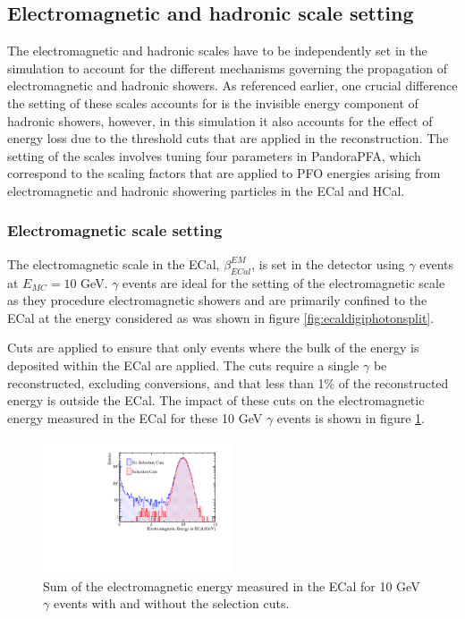 \subsection{Electromagnetic and hadronic scale setting}
The electromagnetic and hadronic scales have to be independently set in the simulation to account for the different mechanisms governing the propagation of electromagnetic and hadronic showers.  As referenced earlier, one crucial difference the setting of these scales accounts for is the invisible energy component of hadronic showers, however, in this simulation it also accounts for the effect of energy loss due to the threshold cuts that are applied in the reconstruction.  The setting of the scales involves tuning four parameters in PandoraPFA, which correspond to the scaling factors that are applied to PFO energies arising from electromagnetic and hadronic showering particles in the ECal and HCal.  


\subsubsection{Electromagnetic scale setting}
\label{sec:emscalesetting}
The electromagnetic scale in the ECal, $\beta^{EM}_{ECal}$, is set in the detector using $\gamma$ events at $E_{MC} = 10$ GeV.  $\gamma$ events are ideal for the setting of the electromagnetic scale as they procedure electromagnetic showers and are primarily confined to the ECal at the energy considered as was shown in figure \ref{fig:ecaldigiphotonsplit}.  

Cuts are applied to ensure that only events where the bulk of the energy is deposited within the ECal are applied.  The cuts require a single $\gamma$ be reconstructed, excluding conversions, and that less than 1\% of the reconstructed energy is outside the ECal.  The impact of these cuts on the electromagnetic energy measured in the ECal for these 10 GeV $\gamma$ events is shown in figure \ref{fig:ecalemscaleselection}.

\begin{figure}
\includegraphics[width=0.5\textwidth]{EnergyEstimators/Plots/Calibration/EMScaleSetting/EMScaleECalSelection.pdf}
\caption[Sum of the electromagnetic energy measured in the ECal for 10 GeV $\gamma$ events with and without the selection cuts.]{Sum of the electromagnetic energy measured in the ECal for 10 GeV $\gamma$ events with and without the selection cuts.}
\label{fig:ecalemscaleselection}
\end{figure}


